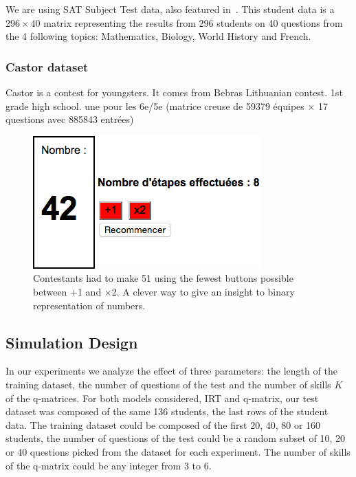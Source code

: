\documentclass{sig-alternate}
\begin{document}
We are using SAT Subject Test data, also featured in~\citep{Winters2005, Desmarais2011}. This student data is a $296 \times 40$ matrix representing the results from 296 students on 40 questions from the 4 following topics: Mathematics, Biology, World History and French.

\subsubsection{Castor dataset}

Castor is a contest for youngsters. It comes from Bebras Lithuanian contest. 1st grade high school.
une pour les 6e/5e (matrice creuse de 59379 équipes $\times$ 17 questions avec 885843 entrées)

\begin{figure}
\includegraphics[width=\linewidth]{51-calc}
\caption{Contestants had to make 51 using the fewest buttons possible between $+$1 and $\times$2. A clever way to give an insight to binary representation of numbers.}
\end{figure}

\subsection{Simulation Design}

In our experiments we analyze the effect of three parameters: the length of the training dataset, the number of questions of the test and the number of skills $K$ of the q-matrices. For both models considered, IRT and q-matrix, our test dataset was composed of the same 136 students, the last rows of the student data. The training dataset could be composed of the first 20, 40, 80 or 160 students, the number of questions of the test could be a random subset of 10, 20 or 40 questions picked from the dataset for each experiment. The number of skills of the q-matrix could be any integer from 3 to 6.
\end{document}

